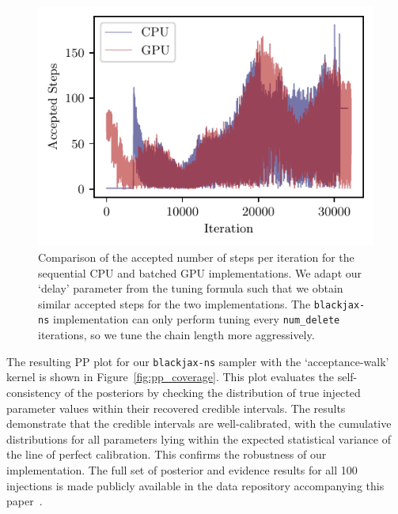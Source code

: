 \documentclass[fleqn,usenatbib]{mnras}
\begin{document}
\begin{figure}
    \centering
    \includegraphics{figures/chain_length_comparison.pdf}
    \caption{Comparison of the accepted number of steps per iteration for the sequential CPU and batched GPU implementations.
    We adapt our `delay' parameter from the tuning formula such that we obtain similar accepted steps for the 
    two implementations. The \texttt{blackjax-ns} implementation can only perform tuning every \mbox{\texttt{num\_delete}} iterations,
    so we tune the chain length more aggressively.}
    \label{fig:chain_length_comparison}
\end{figure}

The resulting PP plot for our \texttt{blackjax-ns} sampler
with the `acceptance-walk' kernel is shown in Figure~\ref{fig:pp_coverage}.
This plot evaluates the self-consistency of the posteriors by checking
the distribution of true injected parameter values within their
recovered credible intervals. The results demonstrate that the credible
intervals are well-calibrated, with the cumulative distributions for all
parameters lying within the expected statistical variance of the
line of perfect calibration. This confirms the robustness of our implementation. The full
set of posterior and evidence results for all 100 injections is made
publicly available in the data repository accompanying this paper~\citep{Prathaban_2025_zenodo}.
\end{document}
